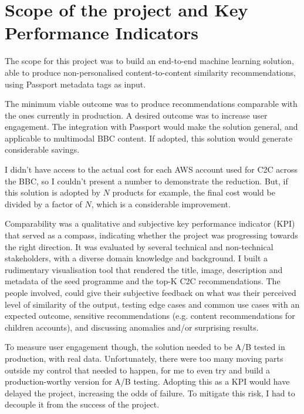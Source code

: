 
\section{Scope of the project and Key Performance Indicators}

The scope for this project was to build an end-to-end machine learning solution, able to produce non-personalised content-to-content
similarity recommendations, using Passport metadata tags as input.

The minimum viable outcome was to produce recommendations comparable with the ones currently in production.
A desired outcome was to increase user engagement. The integration with Passport would make the solution general,
and applicable to multimodal BBC content. If adopted, this solution would generate considerable savings.

I didn't have access to the actual cost for each AWS account used for C2C across the BBC, so I couldn't present a number to demonstrate the reduction.
But, if this solution is adopted by $N$ products for example, the final cost would be divided by a factor of $N$, which is a considerable improvement.

Comparability was a qualitative and subjective key performance indicator (KPI) that served as a compass, indicating whether the project was progressing towards the right direction.
It was evaluated by several technical and non-technical stakeholders, with a diverse domain knowledge and background. I built a rudimentary visualisation
tool that rendered the title, image, description and metadata of the seed programme and the top-K C2C recommendations.
The people involved, could give their subjective feedback on what was their perceived level of similarity of the output,
testing edge cases and common use cases with an expected outcome, sensitive recommendations (e.g. content recommendations for children accounts),
and discussing anomalies and/or surprising results.

To measure user engagement though, the solution needed to be A/B tested in production, with real data.
Unfortunately, there were too many moving parts outside my control that needed to happen, for me to even try and build a production-worthy version for A/B testing.
Adopting this as a KPI would have delayed the project, increasing the odds of failure.
To mitigate this risk, I had to decouple it from the success of the project.

